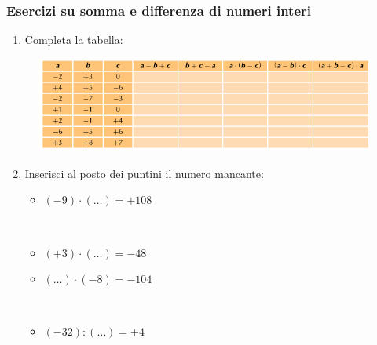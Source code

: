 \documentclass[handout]{beamer}
\theoremstyle{plain}
\begin{document}
\begin{frame}
\frametitle{Esercizi su somma e differenza di numeri interi}
\begin{enumerate}\setcounter{enumi}{0}
  \item Completa la tabella:
\end{enumerate}
\begin{figure}
  \includegraphics[width=\columnwidth]{img/eseinteri1.png}
\end{figure}
\begin{enumerate}\setcounter{enumi}{1}
  \item Inserisci al posto dei puntini il numero mancante:
  \begin{multicols}{2}
    \begin{itemize}
      \item $ (-9) \cdot (\ldots) = +108 $
      
      ~
      \item $ (+3) \cdot (\ldots) = -48 $
      \item $ (\ldots) \cdot (-8) = -104 $
      
      ~
      \item $ (-32) : (\ldots) = +4 $
    \end{itemize}
  \end{multicols}
\end{enumerate}
\end{frame}
\end{document}
